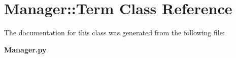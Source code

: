 \section{Manager::Term Class Reference}
\label{classManager_1_1Term}


The documentation for this class was generated from the following file:\begin{CompactItemize}
\item 
{\bf Manager.py}\end{CompactItemize}

